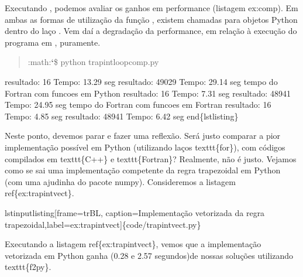 \documentclass[a4paper,10pt,portuguese]{sphinxmanual}
\begin{document}
Executando , podemos avaliar os ganhos em
performance (listagem ex:comp). Em ambas as formas de utilização da
função , existem chamadas para objetos Python dentro do
laço . Vem daí a degradação da performance, em relação à
execução do programa em , puramente.
\begin{quote}

:math:{\color{red}\bfseries{}{}`}\$ python trapintloopcomp.py
\end{quote}

resultado: 16
Tempo: 13.29 seg
resultado: 49029
Tempo: 29.14 seg
tempo do Fortran com funcoes em Python
resultado: 16
Tempo: 7.31 seg
resultado: 48941
Tempo: 24.95 seg
tempo do Fortran com funcoes em Fortran
resultado: 16
Tempo: 4.85 seg
resultado: 48941
Tempo: 6.42 seg
end\{lstlisting\}

Neste ponto, devemos parar e fazer uma reflexão. Será justo comparar a pior implementação possível em Python (utilizando laços texttt\{for\}), com códigos compilados em texttt\{C++\} e texttt\{Fortran\}? Realmente, não é justo. Vejamos como se sai uma implementação competente  da regra trapezoidal em Python (com uma ajudinha do pacote numpy). Consideremos a listagem ref\{ex:trapintvect\}.

lstinputlisting{[}frame=trBL, caption=Implementação vetorizada da regra trapezoidal,label=ex:trapintvect{]}\{code/trapintvect.py\}

Executando a listagem ref\{ex:trapintvect\}, vemos que a implementação vetorizada em Python ganha (0.28 e 2.57 segundos)de nossas soluções utilizando texttt\{f2py\}.
\end{document}
